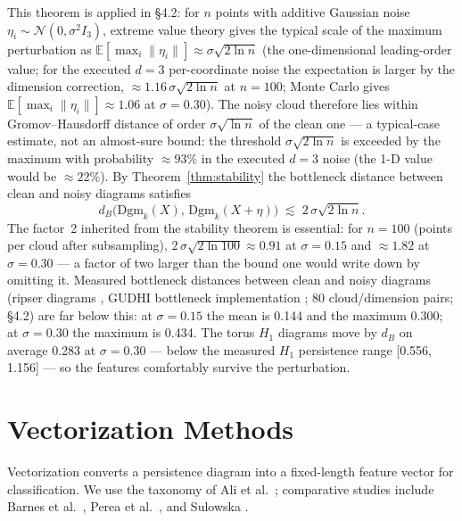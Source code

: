 \documentclass[12pt, a4paper]{report}
\newcommand{\Dgm}{\mathrm{Dgm}}
\newcommand{\E}{\mathbb{E}}
\theoremstyle{definition}
\theoremstyle{plain}
\theoremstyle{remark}
\begin{document}
This theorem is applied in \S4.2: for $n$ points with additive
Gaussian noise $\eta_i \sim \mathcal{N}(0, \sigma^2 I_3)$, extreme
value theory gives the typical scale of the maximum perturbation as
$\E[\max_i \|\eta_i\|] \approx \sigma\sqrt{2\ln n}$ (the
one-dimensional leading-order value; for the executed $d=3$
per-coordinate noise the expectation is larger by the dimension
correction, $\approx 1.16\,\sigma\sqrt{2\ln n}$ at $n=100$; Monte
Carlo gives $\E[\max_i\|\eta_i\|] \approx 1.06$ at $\sigma=0.30$).
The noisy cloud therefore lies within Gromov--Hausdorff distance of
order $\sigma\sqrt{\ln n}$ of the clean one --- a typical-case
estimate, not an almost-sure bound: the threshold
$\sigma\sqrt{2\ln n}$ is exceeded by the maximum with probability
$\approx 93\%$ in the executed $d{=}3$ noise (the 1-D value would be
$\approx 22\%$). By
Theorem~\ref{thm:stability} the bottleneck distance between clean and
noisy diagrams satisfies
\begin{equation}
  d_B\bigl(\Dgm_k(X),\, \Dgm_k(X + \eta)\bigr)
  \;\lesssim\; 2\,\sigma\sqrt{2\ln n}.
  \label{eq:db_bound}
\end{equation}
The factor~2 inherited from the stability theorem is essential: for
$n = 100$ (points per cloud after subsampling),
$2\,\sigma\sqrt{2\ln 100} \approx 0.91$ at $\sigma = 0.15$ and
$\approx 1.82$ at $\sigma = 0.30$ --- a factor of two larger than
the bound one would write down by omitting it. Measured bottleneck
distances between clean and noisy diagrams (ripser diagrams \cite{bauer2021}, GUDHI
bottleneck implementation \cite{maria2014}; 80 cloud/dimension pairs; \S4.2) are far
below this: at $\sigma=0.15$ the mean is 0.144 and the maximum 0.300;
at $\sigma=0.30$ the maximum is 0.434. The torus $H_1$ diagrams move
by $d_B$ on average 0.283 at $\sigma=0.30$ --- below the measured
$H_1$ persistence range [0.556, 1.156] --- so the features
comfortably survive the perturbation.

\section{Vectorization Methods}
\label{sec:vectorization}

Vectorization converts a persistence diagram into a fixed-length
feature vector for classification. We use the taxonomy of Ali et
al.\ \cite{ali2023}; comparative studies include Barnes et
al.\ \cite{barnes2021}, Perea et al.\ \cite{perea2022}, and
Sulowska \cite{sulowska2026}.
\end{document}
